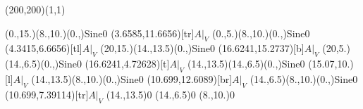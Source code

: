 \unitlength=1bp%

\begin{feynartspicture}(200,200)(1,1)

\FADiagram{}
\FAProp(0.,15.)(8.,10.)(0.,){Sine}{0}
\FALabel(3.6585,11.6656)[tr]{$A|_V$}
\FAProp(0.,5.)(8.,10.)(0.,){Sine}{0}
\FALabel(4.3415,6.6656)[tl]{$A|_V$}
\FAProp(20,15.)(14.,13.5)(0.,){Sine}{0}
\FALabel(16.6241,15.2737)[b]{$A|_V$}
\FAProp(20,5.)(14.,6.5)(0.,){Sine}{0}
\FALabel(16.6241,4.72628)[t]{$A|_V$}
\FAProp(14.,13.5)(14.,6.5)(0.,){Sine}{0}
\FALabel(15.07,10.)[l]{$A|_V$}
\FAProp(14.,13.5)(8.,10.)(0.,){Sine}{0}
\FALabel(10.699,12.6089)[br]{$A|_V$}
\FAProp(14.,6.5)(8.,10.)(0.,){Sine}{0}
\FALabel(10.699,7.39114)[tr]{$A|_V$}
\FAVert(14.,13.5){0}
\FAVert(14.,6.5){0}
\FAVert(8.,10.){0}
\end{feynartspicture}


